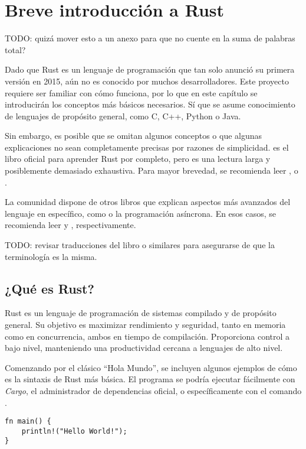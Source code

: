 
\chapter{Breve introducción a Rust}\label{ch:rust}

TODO: quizá mover esto a un anexo para que no cuente en la suma de palabras
total?

Dado que Rust es un lenguaje de programación que tan solo anunció su primera
versión en 2015, aún no es conocido por muchos desarrolladores. Este proyecto
requiere ser familiar con cómo funciona, por lo que en este capítulo se
introducirán los conceptos más básicos necesarios. Sí que se asume conocimiento
de lenguajes de propósito general, como C, C++, Python o Java.

Sin embargo, es posible que se omitan algunos conceptos o que algunas
explicaciones no sean completamente precisas por razones de simplicidad.
\textcite{rustfullbook} es el libro oficial para aprender Rust por completo,
pero es una lectura larga y posiblemente demasiado exhaustiva. Para mayor
brevedad, se recomienda leer \textcite{rustprofessionals},
\textcite{rustgentleintro} o \textcite{rust30min}.

La comunidad dispone de otros libros que explican aspectos más avanzados del
lenguaje en específico, como \unsafe o la programación asíncrona. En esos casos,
se recomienda leer \textcite{rustnomicon} y \textcite{rustasyncbook},
respectivamente.

TODO: revisar traducciones del libro o similares para asegurarse de que la
terminología es la misma.

\section{¿Qué es Rust?}

Rust es un lenguaje de programación de sistemas compilado y de propósito
general. Su objetivo es maximizar rendimiento y seguridad, tanto en memoria como
en concurrencia, ambos en tiempo de compilación. Proporciona control a bajo
nivel, manteniendo una productividad cercana a lenguajes de alto nivel.

Comenzando por el clásico ``Hola Mundo'', se incluyen algunos ejemplos de cómo
es la sintaxis de Rust más básica. El programa se podría ejecutar fácilmente con
\emph{Cargo}, el administrador de dependencias oficial, o específicamente con el
comando .

\begin{verbatim}
fn main() {
    println!("Hello World!");
}
\end{verbatim}

